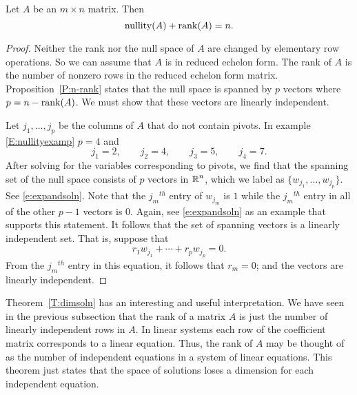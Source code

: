 \documentclass{ximera}
\begin{document}
\begin{theorem}  \label{T:dimsoln}
Let $A$ be an $m\times n$ matrix. Then
\[
{\rm nullity}(A) + {\rm rank}(A) = n.
\]
\end{theorem} 

\begin{proof}	Neither the rank nor the null space of $A$ are changed by
elementary row operations.  So we can assume that $A$ is in reduced
echelon form.  The rank of $A$ is the number of nonzero rows in
the reduced echelon form matrix.  Proposition~\ref{P:n-rank} states that
the null space is spanned by $p$ vectors where $p=n-{\rm rank}(A)$.  We
must show that these vectors are linearly independent.

Let $j_1,\ldots,j_p$ be the columns of $A$ that do not contain pivots.
In example \eqref{E:nullityexamp} $p=4$ and
\[
j_1 = 2, \qquad j_2 = 4, \qquad j_3 = 5, \qquad j_4 = 7.
\]
After solving for the variables corresponding to pivots, we find that
the spanning set of the null space consists of $p$ vectors in $\mbox{$\Bbb{R}$}^n$,
which we label as $\{w_{j_1},\ldots,w_{j_p}\}$.  See \eqref{e:expandsoln}.
Note that the $j_m$$^{th}$  entry of $w_{j_m}$ is $1$ while the
$j_m$$^{th}$ entry in all of the other $p-1$ vectors is $0$.  Again,
see \eqref{e:expandsoln} as an example that supports this statement.  It
follows that the set of spanning vectors is a linearly independent set.
That is, suppose that
\[
r_1w_{j_1} + \cdots + r_pw_{j_p} = 0.
\]
From the $j_m$$^{th}$ entry in this equation, it follows that $r_m=0$;
and the vectors are linearly independent.  \end{proof}

Theorem~\ref{T:dimsoln} has an interesting and useful interpretation.
We have seen in the previous subsection that the rank of a matrix $A$
is just the number of linearly independent rows in $A$.
In linear systems each row of the coefficient matrix corresponds
to a linear equation.  Thus, the rank of $A$ may be thought of as the
number of independent equations in a system of linear equations.
This theorem just states that the space of solutions loses a dimension
for each independent equation.




\end{document}

